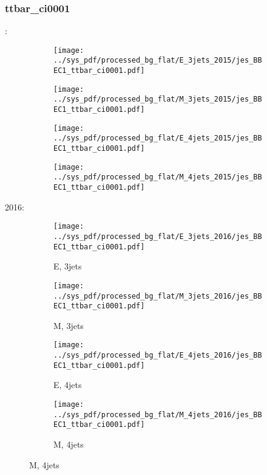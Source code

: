 \documentclass{beamer}
\begin{document}
\begin{frame}
\frametitle{ttbar_ci0001}
\fontsize{5}{1}:
\begin{figure}
\centering
\begin{subfigure}[b]{0.24\textwidth}
\texttt{[image: ../sys\_pdf/processed\_bg\_flat/E\_3jets\_2015/jes\_BBEC1\_ttbar\_ci0001.pdf]}
\end{subfigure}
\begin{subfigure}[b]{0.24\textwidth}
\texttt{[image: ../sys\_pdf/processed\_bg\_flat/M\_3jets\_2015/jes\_BBEC1\_ttbar\_ci0001.pdf]}
\end{subfigure}
\begin{subfigure}[b]{0.24\textwidth}
\texttt{[image: ../sys\_pdf/processed\_bg\_flat/E\_4jets\_2015/jes\_BBEC1\_ttbar\_ci0001.pdf]}
\end{subfigure}
\begin{subfigure}[b]{0.24\textwidth}
\texttt{[image: ../sys\_pdf/processed\_bg\_flat/M\_4jets\_2015/jes\_BBEC1\_ttbar\_ci0001.pdf]}
\end{subfigure}
\end{figure}
2016:
\begin{figure}
\centering
\begin{subfigure}[b]{0.24\textwidth}
\texttt{[image: ../sys\_pdf/processed\_bg\_flat/E\_3jets\_2016/jes\_BBEC1\_ttbar\_ci0001.pdf]}
\captionsetup{font=tiny}
\caption{E, 3jets}
\end{subfigure}
\begin{subfigure}[b]{0.24\textwidth}
\texttt{[image: ../sys\_pdf/processed\_bg\_flat/M\_3jets\_2016/jes\_BBEC1\_ttbar\_ci0001.pdf]}
\captionsetup{font=tiny}
\caption{M, 3jets}
\end{subfigure}
\begin{subfigure}[b]{0.24\textwidth}
\texttt{[image: ../sys\_pdf/processed\_bg\_flat/E\_4jets\_2016/jes\_BBEC1\_ttbar\_ci0001.pdf]}
\captionsetup{font=tiny}
\caption{E, 4jets}
\end{subfigure}
\begin{subfigure}[b]{0.24\textwidth}
\texttt{[image: ../sys\_pdf/processed\_bg\_flat/M\_4jets\_2016/jes\_BBEC1\_ttbar\_ci0001.pdf]}
\captionsetup{font=tiny}
\caption{M, 4jets}
\end{subfigure}
\end{figure}
\end{frame}
\end{document}
